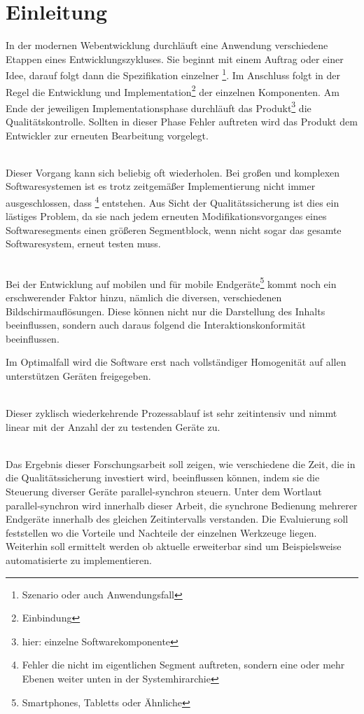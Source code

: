 \chapter{Einleitung}

In der modernen Webentwicklung durchläuft eine Anwendung verschiedene Etappen eines Entwicklungszykluses. Sie beginnt mit einem Auftrag oder einer Idee, darauf folgt dann die Spezifikation einzelner \footnote{Szenario oder auch Anwendungsfall}. Im Anschluss folgt in der Regel die Entwicklung und Implementation\footnote{Einbindung} der einzelnen Komponenten. Am Ende der jeweiligen Implementationsphase durchläuft das Produkt\footnote{hier: einzelne Softwarekomponente} die Qualitätskontrolle. Sollten in dieser Phase Fehler auftreten wird das Produkt dem Entwickler zur erneuten Bearbeitung vorgelegt.

\\Dieser Vorgang kann sich beliebig oft wiederholen. Bei großen und komplexen Softwaresystemen ist es trotz zeitgemäßer Implementierung nicht immer ausgeschlossen, dass \footnote{Fehler die nicht im eigentlichen Segment auftreten, sondern eine oder mehr Ebenen weiter unten in der Systemhirarchie} entstehen. Aus Sicht der Qualitätssicherung ist dies ein lästiges Problem, da sie  nach jedem erneuten Modifikationsvorganges eines Softwaresegments einen größeren Segmentblock, wenn nicht sogar das gesamte Softwaresystem, erneut testen muss.

\\Bei der Entwicklung auf mobilen und für mobile Endgeräte\footnote{Smartphones, Tabletts  oder Ähnliche} kommt noch ein erschwerender Faktor hinzu, nämlich die diversen, verschiedenen Bildschirmauflösungen. Diese können nicht nur die Darstellung des Inhalts beeinflussen, sondern auch daraus folgend die Interaktionskonformität beeinflussen.


Im Optimalfall wird die Software erst nach vollständiger Homogenität auf allen unterstützen Geräten freigegeben.

\\Dieser zyklisch wiederkehrende Prozessablauf ist sehr zeitintensiv und nimmt linear mit der Anzahl der zu testenden Geräte zu.

\\Das Ergebnis dieser Forschungsarbeit soll zeigen, wie verschiedene  die Zeit, die in die Qualitätssicherung investiert wird, beeinflussen können, indem sie die Steuerung diverser Geräte parallel-synchron steuern. Unter dem Wortlaut parallel-synchron wird innerhalb dieser Arbeit, die synchrone Bedienung mehrerer Endgeräte innerhalb des gleichen Zeitintervalls verstanden. Die Evaluierung soll feststellen wo die Vorteile und Nachteile der einzelnen Werkzeuge liegen. Weiterhin soll ermittelt werden ob aktuelle  erweiterbar sind um Beispielsweise automatisierte  zu implementieren. 




